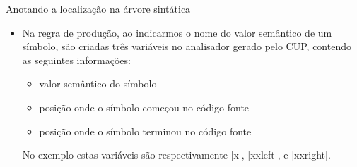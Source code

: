 \documentclass[smaller]{beamer}
\begin{document}
\begin{frame}{Anotando a localização na árvore sintática}
\begin{itemize}
    \item Na regra de produção, ao indicarmos o nome do valor
    semântico de um símbolo, são criadas três variáveis no analisador
    gerado pelo CUP, contendo as seguintes informações:
    \begin{itemize}
      \item valor semântico do símbolo
      \item posição onde o símbolo começou no código fonte
      \item posição onde o símbolo terminou no código fonte
    \end{itemize}
    No exemplo estas variáveis são respectivamente \pyginline|x|,
    \pyginline|xxleft|, e \pyginline|xxright|.
  \end{itemize}
\end{frame}
\end{document}
